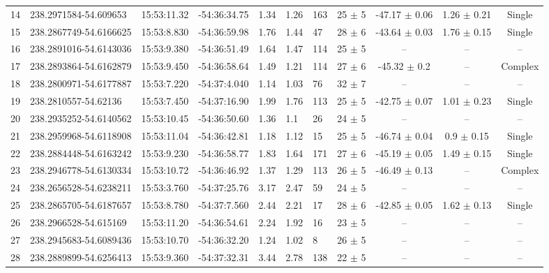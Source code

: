 \documentclass[longauth]{aa} %
\begin{document}
\begin{appendix}
\begin{table}[htbp!]
\begin{tabular}{llllllllccc}
14  &  238.2971584-54.609653  &  15:53:11.32  &  -54:36:34.75  &  1.34  &  1.26  &  163  &  25 $\pm$ 5  &  -47.17 $\pm$ 0.06  &  1.26 $\pm$ 0.21  &  Single \\
15  &  238.2867749-54.6166625  &  15:53:8.830  &  -54:36:59.98  &  1.76  &  1.44  &  47  &  28 $\pm$ 6  &  -43.64 $\pm$ 0.03  &  1.76 $\pm$ 0.15  &  Single \\
16  &  238.2891016-54.6143036  &  15:53:9.380  &  -54:36:51.49  &  1.64  &  1.47  &  114  &  25 $\pm$ 5  &  --  &  --  &  -- \\
17  &  238.2893864-54.6162879  &  15:53:9.450  &  -54:36:58.64  &  1.49  &  1.21  &  114  &  27 $\pm$ 6  &  -45.32 $\pm$ 0.2  &  --  &  Complex \\
18  &  238.2800971-54.6177887  &  15:53:7.220  &  -54:37:4.040  &  1.14  &  1.03  &  76  &  32 $\pm$ 7  &  --  &  --  &  -- \\
19  &  238.2810557-54.62136  &  15:53:7.450  &  -54:37:16.90  &  1.99  &  1.76  &  113  &  25 $\pm$ 5  &  -42.75 $\pm$ 0.07  &  1.01 $\pm$ 0.23  &  Single \\
20  &  238.2935252-54.6140562  &  15:53:10.45  &  -54:36:50.60  &  1.36  &  1.1  &  26  &  24 $\pm$ 5  &  --  &  --  &  -- \\
21  &  238.2959968-54.6118908  &  15:53:11.04  &  -54:36:42.81  &  1.18  &  1.12  &  15  &  25 $\pm$ 5  &  -46.74 $\pm$ 0.04  &  0.9 $\pm$ 0.15  &  Single \\
22  &  238.2884448-54.6163242  &  15:53:9.230  &  -54:36:58.77  &  1.83  &  1.64  &  171  &  27 $\pm$ 6  &  -45.19 $\pm$ 0.05  &  1.49 $\pm$ 0.15  &  Single \\
23  &  238.2946778-54.6130334  &  15:53:10.72  &  -54:36:46.92  &  1.37  &  1.29  &  113  &  26 $\pm$ 5  &  -46.49 $\pm$ 0.13  &  --  &  Complex \\
24  &  238.2656528-54.6238211  &  15:53:3.760  &  -54:37:25.76  &  3.17  &  2.47  &  59  &  24 $\pm$ 5  &  --  &  --  &  -- \\
25  &  238.2865705-54.6187657  &  15:53:8.780  &  -54:37:7.560  &  2.44  &  2.21  &  17  &  28 $\pm$ 6  &  -42.85 $\pm$ 0.05  &  1.62 $\pm$ 0.13  &  Single \\
26  &  238.2966528-54.615169  &  15:53:11.20  &  -54:36:54.61  &  2.24  &  1.92  &  16  &  23 $\pm$ 5  &  --  &  --  &  -- \\
27  &  238.2945683-54.6089436  &  15:53:10.70  &  -54:36:32.20  &  1.24  &  1.02  &  8  &  26 $\pm$ 5  &  --  &  --  &  -- \\
28  &  238.2889899-54.6256413  &  15:53:9.360  &  -54:37:32.31  &  3.44  &  2.78  &  138  &  22 $\pm$ 5  &  --  &  --  &  -- \\

\end{tabular}
\end{table}
\end{appendix}
\end{document}
